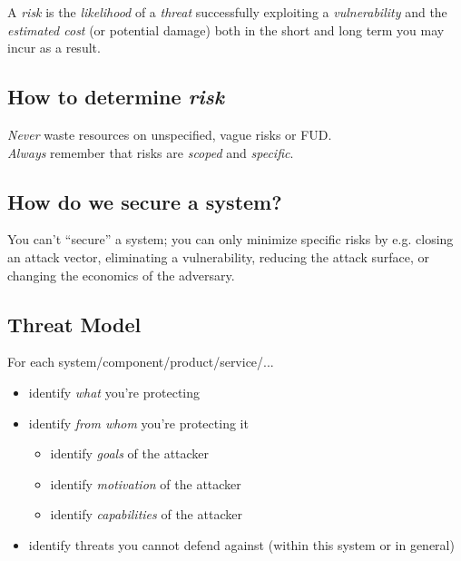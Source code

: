 \documentclass[xga]{xdvislides}
\begin{document}
A {\em risk} is the {\em likelihood} of a {\em threat} successfully exploiting
a {\em vulnerability} and the {\em estimated cost} (or potential damage) both
in the short and long term you may incur as a result.

\subsection{How to determine {\em risk}}
\vspace*{\fill}
\Huge
\begin{center}
{\em Never} waste resources on unspecified, vague risks or FUD. \\
\addvspace{.5in}
{\em Always} remember that risks are {\em scoped} and {\em specific}.
\end{center}
\Normalsize
\vspace*{\fill}

\subsection{How do we secure a system?}
\vspace*{\fill}
\Huge
\begin{center}
You can't ``secure'' a system; you can only minimize
specific risks by e.g. closing an attack vector,
eliminating a vulnerability, reducing the attack
surface, or changing the economics of the adversary.
\end{center}
\Normalsize
\vspace*{\fill}


\subsection{Threat Model}
For each system/component/product/service/...

\begin{itemize}
	\item identify {\em what} you're protecting
	\item identify {\em from whom} you're protecting it
		\begin{itemize}
			\item identify {\em goals} of the attacker
			\item identify {\em motivation} of the attacker
			\item identify {\em capabilities} of the attacker
		\end{itemize}
	\item identify threats you cannot defend against (within this
		system or in general)
\end{itemize}
\end{document}
